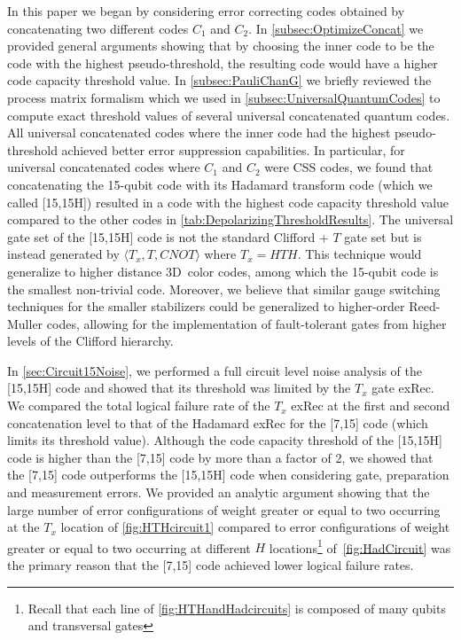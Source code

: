 \documentclass[pra,longbibliography,twocolumn,showpacs,nofootinbib,superscriptaddress,notitlepage]{revtex4-1}
\begin{document}
In this paper we began by considering error correcting codes obtained by concatenating two different codes $C_{1}$ and $C_{2}$. In \cref{subsec:OptimizeConcat} we provided general arguments showing that by choosing the inner code to be the code with the highest pseudo-threshold, the resulting code would have a higher code capacity threshold value. In \cref{subsec:PauliChanG} we briefly reviewed the process matrix formalism which we used in \cref{subsec:UniversalQuantumCodes} to compute exact threshold values of several universal concatenated quantum codes. All universal concatenated codes where the inner code had the highest pseudo-threshold achieved better error suppression capabilities. In particular, for universal concatenated codes where $C_1$ and $C_2$ were CSS codes, we found that concatenating the 15-qubit code with its Hadamard transform code (which we called [15,15H]) resulted in a code with the highest code capacity threshold value compared to the other codes in \cref{tab:DepolarizingThresholdResults}. The universal gate set of the [15,15H] code is not the standard Clifford + $T$ gate set but is instead generated by $\langle T_{x}, T, CNOT \rangle$ where $T_{x} = HTH$. This technique would generalize to higher distance 3D~color codes, among which the 15-qubit code is the smallest non-trivial code. Moreover, we believe that similar gauge switching techniques for the smaller stabilizers could be generalized to higher-order Reed-Muller codes, allowing for the implementation of fault-tolerant gates from higher levels of the Clifford hierarchy.

In \cref{sec:Circuit15Noise}, we performed a full circuit level noise analysis of the [15,15H] code and showed that its threshold was limited by the $T_{x}$ gate exRec. We compared the total logical failure rate of the $T_{x}$ exRec at the first and second concatenation level to that of the Hadamard exRec for the [7,15] code (which limits its threshold value). Although the code capacity threshold of the [15,15H] code is higher than the [7,15] code by more than a factor of 2, we showed that the [7,15] code outperforms the [15,15H] code when considering gate, preparation and measurement errors. We provided an analytic argument showing that the large number of error configurations of weight greater or equal to two occurring at the $T_{x}$ location of \cref{fig:HTHcircuit1} compared to error configurations of weight greater or equal to two occurring at different $H$ locations\footnote{Recall that each line of \cref{fig:HTHandHadcircuits} is composed of many qubits and transversal gates} of~\cref{fig:HadCircuit} was the primary reason that the [7,15] code achieved lower logical failure rates.
\end{document}
